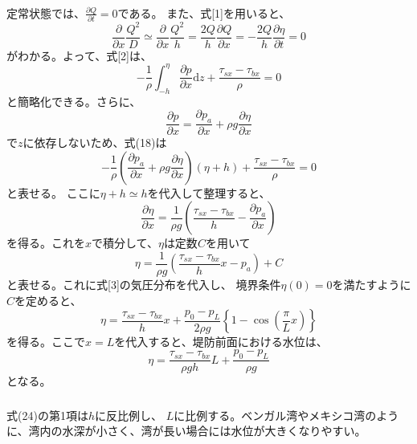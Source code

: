 \documentclass[a4paper]{jsarticle}
\begin{document}
\subsubsection{}
定常状態では、$\frac{\partial Q}{\partial t} = 0$である。
また、式[1]を用いると、
\begin{equation}
  \frac{\partial}{\partial x} \frac{Q^2}{D}
  \simeq \frac{\partial}{\partial x} \frac{Q^2}{h}
  = \frac{2Q}{h} \frac{\partial Q}{\partial x}
  = -\frac{2Q}{h} \frac{\partial \eta}{\partial t} = 0
\end{equation}
がわかる。よって、式[2]は、
\begin{equation}
  -\frac{1}{\rho} 
  \int_{-h}^{\eta} \frac{\partial p}{\partial x} \mathrm{d} z
  + \frac{\tau_{sx} - \tau_{bx}}{\rho} = 0
\end{equation}
と簡略化できる。さらに、
\begin{equation}
  \frac{\partial p}{\partial x}
  = \frac{\partial p_a}{\partial x} + \rho g \frac{\partial \eta}{\partial x}
\end{equation}
で$z$に依存しないため、式(18)は
\begin{equation}
  -\frac{1}{\rho} 
  \left(\frac{\partial p_a}{\partial x}
  + \rho g \frac{\partial \eta}{\partial x}\right)
  (\eta + h)
  + \frac{\tau_{sx} - \tau_{bx}}{\rho} = 0
\end{equation}
と表せる。
ここに$\eta + h \simeq h$を代入して整理すると、
\begin{equation}
  \frac{\partial \eta}{\partial x}
  = \frac{1}{\rho g}
  \left(\frac{\tau_{sx} - \tau_{bx}}{h} - \frac{\partial p_a}{\partial x}\right)
\end{equation}
を得る。これを$x$で積分して、$\eta$は定数$C$を用いて
\begin{equation}
  \eta = \frac{1}{\rho g}
  \left(\frac{\tau_{sx} - \tau_{bx}}{h} x - p_a\right) + C
\end{equation}
と表せる。これに式[3]の気圧分布を代入し、
境界条件$\eta(0) = 0$を満たすように$C$を定めると、
\begin{equation}
  \eta = \frac{\tau_{sx} - \tau_{bx}}{h} x + 
  \frac{p_0 - p_L}{2 \rho g}
  \left\{1 - \cos \left(\frac{\pi}{L} x\right)\right\}
\end{equation}
を得る。ここで$x = L$を代入すると、堤防前面における水位は、
\begin{equation}
  \eta = \frac{\tau_{sx} - \tau_{bx}}{\rho g h} L + \frac{p_0 - p_L}{\rho g}
\end{equation}
となる。
\subsubsection{}
式(24)の第1項は$h$に反比例し、
$L$に比例する。ベンガル湾やメキシコ湾のように、湾内の水深が小さく、湾が長い場合には水位が大きくなりやすい。
\end{document}

